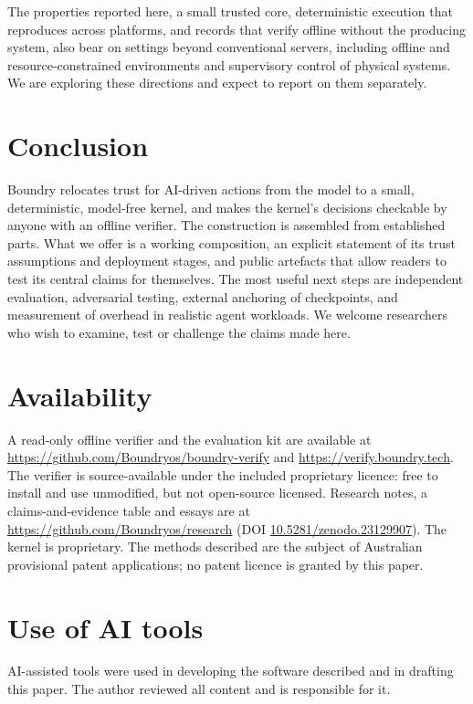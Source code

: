 \documentclass[11pt,a4paper]{article}
\begin{document}
The properties reported here, a small trusted core, deterministic execution that reproduces across platforms, and records that verify offline without the producing system, also bear on settings beyond conventional servers, including offline and resource-constrained environments and supervisory control of physical systems. We are exploring these directions and expect to report on them separately.

\section{Conclusion}

Boundry relocates trust for AI-driven actions from the model to a small, deterministic, model-free kernel, and makes the kernel's decisions checkable by anyone with an offline verifier. The construction is assembled from established parts. What we offer is a working composition, an explicit statement of its trust assumptions and deployment stages, and public artefacts that allow readers to test its central claims for themselves. The most useful next steps are independent evaluation, adversarial testing, external anchoring of checkpoints, and measurement of overhead in realistic agent workloads. We welcome researchers who wish to examine, test or challenge the claims made here.

\section*{Availability}
A read-only offline verifier and the evaluation kit are available at \url{https://github.com/Boundryos/boundry-verify} and \url{https://verify.boundry.tech}. The verifier is source-available under the included proprietary licence: free to install and use unmodified, but not open-source licensed. Research notes, a claims-and-evidence table and essays are at \url{https://github.com/Boundryos/research} (DOI \href{https://doi.org/10.5281/zenodo.23129907}{10.5281/zenodo.23129907}). The kernel is proprietary. The methods described are the subject of Australian provisional patent applications; no patent licence is granted by this paper.

\section*{Use of AI tools}
AI-assisted tools were used in developing the software described and in drafting this paper. The author reviewed all content and is responsible for it.

{\small


}
\end{document}
